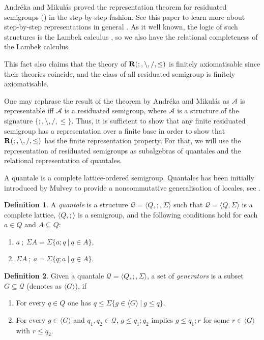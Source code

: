 \documentclass[a4paper]{article}
\theoremstyle{definition}
\newtheorem{definition}{Definition}
\theoremstyle{theorem}
\theoremstyle{proposition}
\theoremstyle{lemma}
\theoremstyle{ex}
\theoremstyle{corollary}
\theoremstyle{claim}
\begin{document}
 Andr\'{e}ka and Mikul\'{a}s proved the representation theorem for residuated semigroups (\cite{andreka1994lambek}) in the step-by-step fashion. See this paper to learn more about step-by-step representations in general \cite{hirsch1997step}. As it well known, the logic of such structures is the Lambek calculus \cite{lambek1958mathematics}, so we also have the relational completeness of the Lambek calculus.

This fact also claims that the theory of ${\bf R}(;, \setminus, /, \leq)$ is finitely axiomatisable since their theories coincide, and the class of all residuated semigroup is finitely axiomatisable.

One may rephrase the result of the theorem by Andr\'{e}ka and Mikul\'{a}s as $\mathcal{A}$ is representable iff $\mathcal{A}$ is a residuated semigroup, where $\mathcal{A}$ is a structure of the signature $\{ ;, \setminus, /, \leq \}$. Thus, it is sufficient to show that any finite residuated semigroup has a representation over a finite base in order to show that ${\bf R}(;, \setminus, /, \leq)$ has the finite representation property. For that, we will use the representation of residuated
semigroups as subalgebras of quantales and the relational representation of quantales.

A quantale is a complete lattice-ordered semigroup. Quantales has been initially introduced by Mulvey to provide a noncommutative generalisation of locales, see \cite{mulvey1986suppl}.

\begin{definition}
  A \emph{quantale} is a structure $\mathcal{Q} = \langle Q, ;, \Sigma \rangle$ such that $\mathcal{Q} = \langle Q, \Sigma \rangle$ is a complete lattice, $\langle Q, ; \rangle$ is a semigroup, and the following conditions hold for each $a \in Q$ and $A \subseteq Q$:
  \begin{enumerate}
    \item $a \: ; \: \Sigma A = \Sigma \{ a ; q \: | \: q \in A \}$,
    \item $\Sigma A \: ; \: a = \Sigma \{ q ; a \: | \: q \in A \}$.
  \end{enumerate}
\end{definition}

\begin{definition}\label{gen}
Given a quantale $\mathcal{Q} = \langle Q, ;, \Sigma \rangle$, a set of \emph{generators} is a subset $G \subseteq \mathcal{Q}$ (denotes as $\langle G \rangle$), if
\begin{enumerate}
  \item For every $q \in Q$ one has $q \leq \Sigma \{ g \in \langle G \rangle \: | \: g \leq q \}$.
  \item For every $g \in \langle G \rangle$ and $q_1, q_2 \in \mathcal{Q}$, $g \leq q_1 ; q_2$ implies $g \leq q_1 ; r$ for some $r \in \langle G \rangle$ with $r \leq q_2$.
\end{enumerate}
\end{definition}
\end{document}
